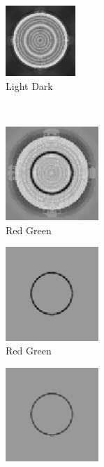 \documentclass[journal,onecolumn]{IEEEtran}
\begin{document}
{\begin{figure}[H]
\begin{subfigure}[b]{0.25\textwidth}
    \end{subfigure}%
    \begin{subfigure}[b]{0.25\textwidth}
            \centering
            \includegraphics[width=100px, frame]{test-circle-neon-dwt-b-ld}
            \caption{Light Dark}
            \label{fig:test-circle-neon-dwt-b-ld}
    \end{subfigure}\\
    \begin{subfigure}[b]{0.25\textwidth}
            \centering
            \includegraphics[width=100pt, frame]{test-circle-neon-dwt-a-rg}
            \caption{Red Green}
            \label{fig:test-circle-neon-dwt-a-rg}
    \end{subfigure}%
    \begin{subfigure}[b]{0.25\textwidth}
            \centering
            \includegraphics[width=100pt, frame]{test-circle-neon-dwt-a-rg-mask}
            \caption{Red Green}
            \label{fig:test-circle-neon-dwt-a-rg-mask}
    \end{subfigure}%
    \begin{subfigure}[b]{0.25\textwidth}
            \centering
            \includegraphics[width=100pt, frame]{test-circle-neon-dwt-b-rg-mask}

\end{subfigure}
\end{figure}}
\end{document}
